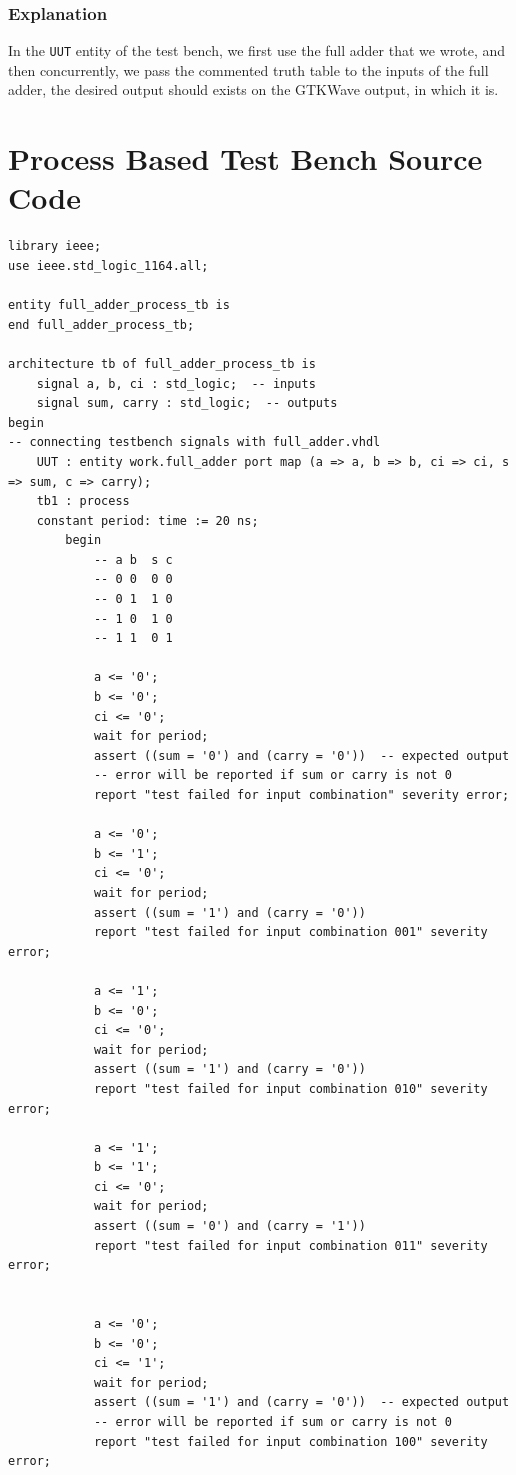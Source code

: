 \documentclass[dvipsnames, svgnames, x11names, a4paper, 11pt,]{article}
\begin{document}
\subsubsection{Explanation}
In the \texttt{UUT} entity of the test bench, we first use the full adder that we wrote, and then concurrently, we pass the commented truth table to the inputs of the full adder, the desired output should exists on the GTKWave output, in which it is.

\newpage
\section{Process Based Test Bench Source Code}
\begin{lstlisting}
library ieee;
use ieee.std_logic_1164.all;

entity full_adder_process_tb is
end full_adder_process_tb;

architecture tb of full_adder_process_tb is
    signal a, b, ci : std_logic;  -- inputs
    signal sum, carry : std_logic;  -- outputs
begin
-- connecting testbench signals with full_adder.vhdl
    UUT : entity work.full_adder port map (a => a, b => b, ci => ci, s => sum, c => carry);
    tb1 : process
    constant period: time := 20 ns;
        begin
            -- a b  s c
            -- 0 0  0 0
            -- 0 1  1 0
            -- 1 0  1 0
            -- 1 1  0 1

            a <= '0';
            b <= '0';
            ci <= '0';
            wait for period;
            assert ((sum = '0') and (carry = '0'))  -- expected output
            -- error will be reported if sum or carry is not 0
            report "test failed for input combination" severity error;

            a <= '0';
            b <= '1';
            ci <= '0';
            wait for period;
            assert ((sum = '1') and (carry = '0'))
            report "test failed for input combination 001" severity error;

            a <= '1';
            b <= '0';
            ci <= '0';
            wait for period;
            assert ((sum = '1') and (carry = '0'))
            report "test failed for input combination 010" severity error;

            a <= '1';
            b <= '1';
            ci <= '0';
            wait for period;
            assert ((sum = '0') and (carry = '1'))
            report "test failed for input combination 011" severity error;


            a <= '0';
            b <= '0';
            ci <= '1';
            wait for period;
            assert ((sum = '1') and (carry = '0'))  -- expected output
            -- error will be reported if sum or carry is not 0
            report "test failed for input combination 100" severity error;


\end{lstlisting}
\end{document}
